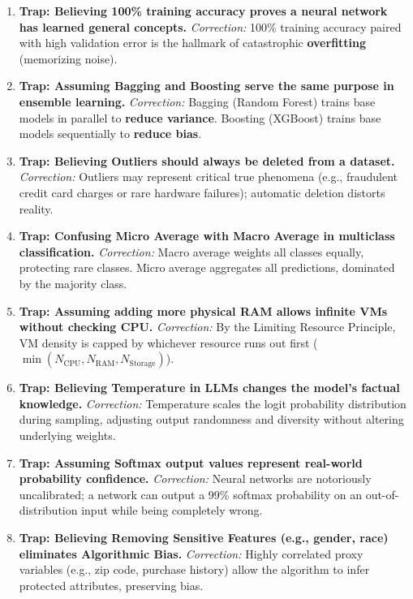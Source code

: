 \begin{enumerate}[label=\arabic*.,leftmargin=2em]
    \item \textbf{Trap: Believing 100\% training accuracy proves a neural network has learned general concepts.}
    \textit{Correction:} 100\% training accuracy paired with high validation error is the hallmark of catastrophic \textbf{overfitting} (memorizing noise).

    \item \textbf{Trap: Assuming Bagging and Boosting serve the same purpose in ensemble learning.}
    \textit{Correction:} Bagging (Random Forest) trains base models in parallel to \textbf{reduce variance}. Boosting (XGBoost) trains base models sequentially to \textbf{reduce bias}.

    \item \textbf{Trap: Believing Outliers should always be deleted from a dataset.}
    \textit{Correction:} Outliers may represent critical true phenomena (e.g., fraudulent credit card charges or rare hardware failures); automatic deletion distorts reality.

    \item \textbf{Trap: Confusing Micro Average with Macro Average in multiclass classification.}
    \textit{Correction:} Macro average weights all classes equally, protecting rare classes. Micro average aggregates all predictions, dominated by the majority class.

    \item \textbf{Trap: Assuming adding more physical RAM allows infinite VMs without checking CPU.}
    \textit{Correction:} By the Limiting Resource Principle, VM density is capped by whichever resource runs out first ($\min(N_{\text{CPU}}, N_{\text{RAM}}, N_{\text{Storage}})$).

    \item \textbf{Trap: Believing Temperature in LLMs changes the model's factual knowledge.}
    \textit{Correction:} Temperature scales the logit probability distribution during sampling, adjusting output randomness and diversity without altering underlying weights.

    \item \textbf{Trap: Assuming Softmax output values represent real-world probability confidence.}
    \textit{Correction:} Neural networks are notoriously uncalibrated; a network can output a 99\% softmax probability on an out-of-distribution input while being completely wrong.

    \item \textbf{Trap: Believing Removing Sensitive Features (e.g., gender, race) eliminates Algorithmic Bias.}
    \textit{Correction:} Highly correlated proxy variables (e.g., zip code, purchase history) allow the algorithm to infer protected attributes, preserving bias.


\end{enumerate}
